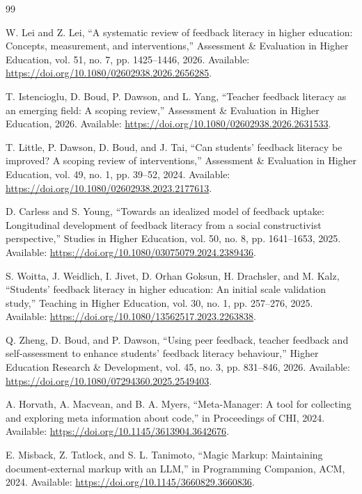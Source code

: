 \documentclass[10pt,conference,letterpaper]{IEEEtran}
\begin{document}
\begin{thebibliography}{99}

 W. Lei and Z. Lei, “A systematic review of feedback literacy in higher education: Concepts, measurement, and interventions,” Assessment \& Evaluation in Higher Education, vol. 51, no. 7, pp. 1425–1446, 2026. Available: \url{https://doi.org/10.1080/02602938.2026.2656285}.

 T. Istencioglu, D. Boud, P. Dawson, and L. Yang, “Teacher feedback literacy as an emerging field: A scoping review,” Assessment \& Evaluation in Higher Education, 2026. Available: \url{https://doi.org/10.1080/02602938.2026.2631533}.

 T. Little, P. Dawson, D. Boud, and J. Tai, “Can students’ feedback literacy be improved? A scoping review of interventions,” Assessment \& Evaluation in Higher Education, vol. 49, no. 1, pp. 39–52, 2024. Available: \url{https://doi.org/10.1080/02602938.2023.2177613}.

 D. Carless and S. Young, “Towards an idealized model of feedback uptake: Longitudinal development of feedback literacy from a social constructivist perspective,” Studies in Higher Education, vol. 50, no. 8, pp. 1641–1653, 2025. Available: \url{https://doi.org/10.1080/03075079.2024.2389436}.

 S. Woitta, J. Weidlich, I. Jivet, D. Orhan Goksun, H. Drachsler, and M. Kalz, “Students’ feedback literacy in higher education: An initial scale validation study,” Teaching in Higher Education, vol. 30, no. 1, pp. 257–276, 2025. Available: \url{https://doi.org/10.1080/13562517.2023.2263838}.

 Q. Zheng, D. Boud, and P. Dawson, “Using peer feedback, teacher feedback and self-assessment to enhance students’ feedback literacy behaviour,” Higher Education Research \& Development, vol. 45, no. 3, pp. 831–846, 2026. Available: \url{https://doi.org/10.1080/07294360.2025.2549403}.

 A. Horvath, A. Macvean, and B. A. Myers, “Meta-Manager: A tool for collecting and exploring meta information about code,” in Proceedings of CHI, 2024. Available: \url{https://doi.org/10.1145/3613904.3642676}.

 E. Misback, Z. Tatlock, and S. L. Tanimoto, “Magic Markup: Maintaining document-external markup with an LLM,” in Programming Companion, ACM, 2024. Available: \url{https://doi.org/10.1145/3660829.3660836}.


\end{thebibliography}
\end{document}
